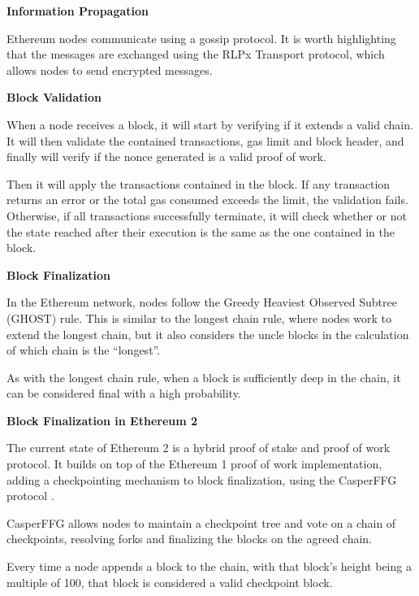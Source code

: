 \vspace{0.25cm}


\textbf{Information Propagation}

Ethereum nodes communicate using a gossip protocol. It is worth highlighting that the messages are exchanged using the RLPx Transport protocol, which allows nodes to send encrypted messages.

\vspace{0.25cm}

\textbf{Block Validation}

When a node receives a block, it will start by verifying if it extends a valid chain. It will then validate the contained transactions, gas limit and block header, and finally will verify if the nonce generated is a valid proof of work.

Then it will apply the transactions contained in the block. If any transaction returns an error or the total gas consumed exceeds the limit, the validation fails. Otherwise, if all transactions successfully terminate, it will check whether or not the state reached after their execution is the same as the one contained in the block.


\vspace{0.25cm}

\textbf{Block Finalization}

In the Ethereum network, nodes follow the Greedy Heaviest Observed Subtree (GHOST) rule. This is similar to the longest chain rule, where nodes work to extend the longest chain, but it also considers the uncle blocks in the calculation of which chain is the “longest”.

As with the longest chain rule, when a block is sufficiently deep in the chain, it can be considered final with a high probability.

\vspace{0.25cm}

\textbf{Block Finalization in Ethereum 2}

The current state of Ethereum 2 is a hybrid proof of stake and proof of work protocol. It builds on top of the Ethereum 1 proof of work implementation, adding a checkpointing mechanism to block finalization, using the CasperFFG protocol \cite{casperffg}.

CasperFFG \cite{casperffg} allows nodes to maintain a checkpoint tree and vote on a chain of checkpoints, resolving forks and finalizing the blocks on the agreed chain.

Every time a node appends a block to the chain, with that block’s height being a multiple of 100, that block is considered a valid checkpoint block.

